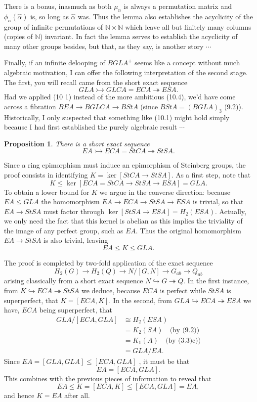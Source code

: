 \documentclass[openany,leqno]{book}  %
\newcommand{\N}{\mathbb{N}}
\newtheorem{prop}[theorem]{Proposition}
\begin{document}
There is a bonus, inasmuch as both $\mu_n$ is always a permutation matrix and $\phi_n(\hat{\alpha})$ is, so long as $\hat{\alpha}$ was. Thus the lemma also establishes the acyclicity of the group of infinite permutations of $\N \times \N$ which leave all but finitely many columns (copies of $\N$) invariant. In fact the lemma serves to establish the acyclicity of many other groups besides, but that, as they say, is another story $\cdots $

Finally, if an infinite delooping of $BGLA^+$ seems like a concept without much algebraic motivation, I can offer the following interpretation of the second stage. The first, you will recall came from the short exact sequence
\[GLA \rightarrowtail GLCA = ECA\twoheadrightarrow ESA .\]
Had we applied (10 1) instead of the more ambitious (10.4), we'd have come across a fibration $BEA \longrightarrow BGLCA \longrightarrow  BStA$ (since $BStA = (BGLA)_3$ (9.2)). Historically, I only suspected that something like (10.1) might hold simply because I had first established the purely algebraic result $\cdots $

\begin{prop}
 	There is a short exact sequence
\[EA \rightarrowtail ECA = StCA \twoheadrightarrow StSA .\]
 \end{prop} 
Since a ring epimorphism must induce an epimorphism of Steinberg groups, the proof consists in identifying $K = \ker [StCA \longrightarrow StSA]$. As a first step, note that
\[K \leqslant \ker [ECA = StCA\longrightarrow StSA\longrightarrow ESA] = GLA.\]
To obtain a lower bound for $K$ we argue in the converse direction: because $EA \leqslant GLA$ the homomorphism $EA\longrightarrow  ECA\longrightarrow StSA \longrightarrow ESA$ is trivial, so that $EA\longrightarrow  StSA$ must factor through $\ker [StSA \longrightarrow ESA] = H_2(ESA)$. Actually, we only need the fact that this kernel is abelian as this implies the triviality of the image of any perfect group, such as $EA$. Thus the original homomorphism $EA \longrightarrow StSA$ is also trivial, leaving
\[EA\leqslant K\leqslant GLA .\]

The proof is completed by two-fold application of the exact sequence 
\[H_2(G) \longrightarrow H_2(Q) \longrightarrow  N/[G, N] \longrightarrow G_{ab} \longrightarrow Q_{ab}\]
arising classically from a short exact sequence $N \hookrightarrow G\twoheadrightarrow Q$. In the first instance, from $K \hookrightarrow  ECA\twoheadrightarrow StSA$ we deduce, because $ECA$ is perfect while $StSA$ is superperfect, that $K = [ECA, K]$. In the second, from $GLA \hookrightarrow ECA\twoheadrightarrow ESA$ we have, $ECA$ being superperfect, that
\begin{align*}
 GLA/[ECA,GLA] & \cong H_2(ESA)\\
 &=K_2(SA) \quad \mbox{(by (9.2))} \\
 &=K_1(A) \quad \mbox{(by (3.3)c))} \\
 &=GLA/EA.
\end{align*}
Since $EA= [GLA, GLA] \leqslant [ECA, GLA]$ , it must be that 
\[EA = [ECA, GLA] .\]
This combines with the previous pieces of information to reveal that 
\[EA\leqslant K = [ECA,K] \leqslant [ECA, GLA] = EA,\]
 and hence $K = EA$ after all.
\end{document}
